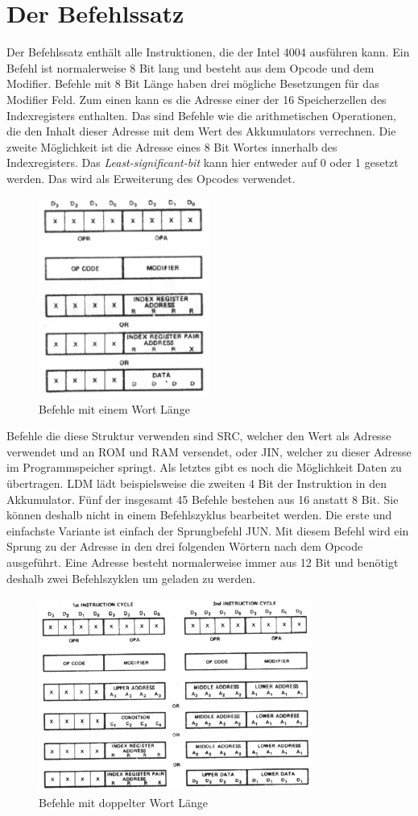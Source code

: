\section{Der Befehlssatz}
\label{ch:befehlssatz}
Der Befehlssatz enthält alle Instruktionen, die der Intel 4004 ausführen kann. Ein Befehl ist normalerweise 8 Bit lang und besteht aus dem Opcode und dem Modifier. Befehle mit 8 Bit Länge haben drei mögliche Besetzungen für das Modifier Feld. Zum einen kann es die Adresse einer der 16 Speicherzellen des Indexregisters enthalten. Das sind Befehle wie die arithmetischen Operationen, die den Inhalt dieser Adresse mit dem Wert des Akkumulators verrechnen. Die zweite Möglichkeit ist die Adresse eines 8 Bit Wortes innerhalb des Indexregisters. Das \textit{Least-significant-bit} kann hier entweder auf 0 oder 1 gesetzt werden. Das wird als Erweiterung des Opcodes verwendet. 
\begin{figure}[h]
	 	\centering
	 	\includegraphics[width=0.5\textwidth]{figures/instruction_one.png}
	 	\caption{Befehle mit einem Wort Länge}
	 	\label{fig:instructions1}
\end{figure}
Befehle die diese Struktur verwenden sind SRC, welcher den Wert als Adresse verwendet und an ROM und RAM versendet, oder JIN, welcher zu dieser Adresse im Programmspeicher springt. Als letztes gibt es noch die Möglichkeit Daten zu übertragen. LDM lädt beispielsweise die zweiten 4 Bit der Instruktion in den Akkumulator.
Fünf der insgesamt 45 Befehle bestehen aus 16 anstatt 8 Bit. Sie können deshalb nicht in einem Befehlszyklus bearbeitet werden. Die erste und einfachste Variante ist einfach der Sprungbefehl JUN. Mit diesem Befehl wird ein Sprung zu der Adresse in den drei folgenden Wörtern nach dem Opcode ausgeführt. Eine Adresse besteht normalerweise immer aus 12 Bit und benötigt deshalb zwei Befehlszyklen um geladen zu werden.
\begin{figure}
	 	\centering
	 	\includegraphics[width=0.8\textwidth]{figures/instruction_two.png}
	 	\caption{Befehle mit doppelter Wort Länge}
	 	\label{fig:instructions2}
\end{figure}